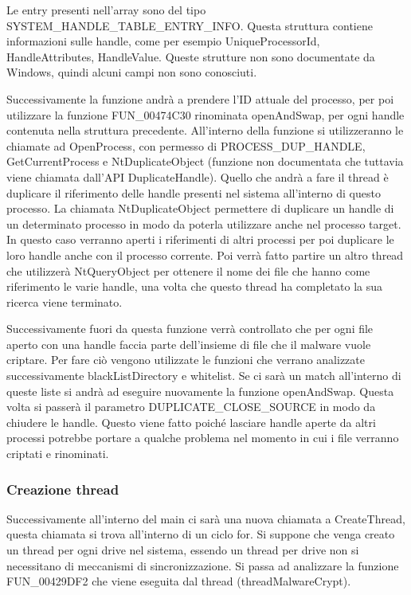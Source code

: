\documentclass[a4paper,12pt]{article}
\begin{document}
Le entry presenti nell'array sono del tipo \\SYSTEM\_HANDLE\_TABLE\_ENTRY\_INFO. Questa struttura contiene informazioni sulle handle, come per esempio UniqueProcessorId, HandleAttributes, HandleValue. Queste strutture non sono documentate da Windows, quindi alcuni campi non sono conosciuti. 

Successivamente la funzione andrà a prendere l'ID attuale del processo, per poi utilizzare la funzione FUN\_00474C30 rinominata openAndSwap, per ogni handle contenuta nella struttura precedente. All'interno della funzione si utilizzeranno le chiamate ad OpenProcess, con permesso di PROCESS\_DUP\_HANDLE, GetCurrentProcess e NtDuplicateObject (funzione non documentata che tuttavia viene chiamata dall'API DuplicateHandle). Quello che andrà a fare il thread è duplicare il riferimento delle handle presenti nel sistema all'interno di questo processo. La chiamata NtDuplicateObject permettere di duplicare un handle di un determinato processo in modo da poterla utilizzare anche nel processo target. In questo caso verranno aperti i riferimenti di altri processi per poi duplicare le loro handle anche con il processo corrente.  Poi verrà fatto partire un altro thread che utilizzerà NtQueryObject per ottenere il nome dei file che hanno come riferimento le varie handle, una volta che questo thread ha completato la sua ricerca viene terminato.

Successivamente fuori da questa funzione verrà controllato che per ogni file aperto con una handle faccia parte dell'insieme di file che il malware vuole criptare. Per fare ciò vengono utilizzate le funzioni che verrano analizzate successivamente blackListDirectory e whitelist. Se ci sarà un match all'interno di queste liste si andrà ad eseguire nuovamente la funzione openAndSwap. Questa volta si passerà il parametro DUPLICATE\_CLOSE\_SOURCE in modo da chiudere le handle. Questo viene fatto poiché lasciare handle aperte da altri processi potrebbe portare a qualche problema nel momento in cui i file verranno criptati e rinominati.

\subsubsection{Creazione thread }
Successivamente all'interno del main ci sarà una nuova chiamata a CreateThread, questa chiamata si trova all'interno di un ciclo for. Si suppone che venga creato un thread per ogni drive nel sistema, essendo un thread per drive non si necessitano di meccanismi di sincronizzazione. Si passa ad analizzare la funzione FUN\_00429DF2 che viene eseguita dal thread (threadMalwareCrypt). 
\end{document}
